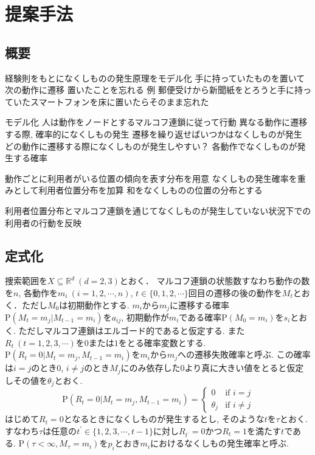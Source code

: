 \chapter{提案手法}\label{chap:method}

\section{概要}
経験則をもとになくしものの発生原理をモデル化
手に持っていたものを置いて次の動作に遷移
置いたことを忘れる
例
郵便受けから新聞紙をとろうと手に持っていたスマートフォンを床に置いたらそのまま忘れた

モデル化
人は動作をノードとするマルコフ連鎖に従って行動
異なる動作に遷移する際, 確率的になくしもの発生
遷移を繰り返せばいつかはなくしものが発生
どの動作に遷移する際になくしものが発生しやすい？
各動作でなくしものが発生する確率

動作ごとに利用者がいる位置の傾向を表す分布を用意
なくしもの発生確率を重みとして利用者位置分布を加算
和をなくしものの位置の分布とする

利用者位置分布とマルコフ連鎖を通じてなくしものが発生していない状況下での利用者の行動を反映

\section{定式化}
捜索範囲を$ X \subseteq \mathbb{R}^d \  (d=2,3)$とおく．
マルコフ連鎖の状態数すなわち動作の数を$ n $, 各動作を$ m_i\ (i=1,2,\cdots ,n)$, 
$ t \in \{0,1,2,\cdots\} $回目の遷移の後の動作を$ M_t $とおく．ただし$ M_0 $は初期動作とする. 
$ m_i $から$ m_j $に遷移する確率$ \mathrm{P}(M_t = m_j | M_{t-1} = m_i) $を$ a_{i j} $, 
初期動作が$ m_i $である確率$ \mathrm{P}(M_0 = m_i) $を$ s_i $とおく. 
ただしマルコフ連鎖はエルゴード的であると仮定する. \cite{funaki}
また$ R_t\ (t=1,2,3,\cdots) $を$ 0 $または$ 1 $をとる確率変数とする. 
$ \mathrm{P}(R_t = 0 | M_t = m_j , M_{t - 1} = m_i) $を$ m_i $から$ m_j $への遷移失敗確率と呼ぶ. 
この確率は$ i = j $のとき$ 0 $, $ i \ne j $のとき$ M_j $にのみ依存した$ 0 $より真に大きい値をとると仮定しその値を$ \theta_j $とおく. 
\begin{equation}
    \mathrm{P}(R_t = 0 | M_t = m_j , M_{t - 1} = m_i) =
    \begin{cases}
        0        & \text{if $i = j$}\\
        \theta_j & \text{if $i \ne j$}
    \end{cases}
\end{equation}
はじめて$ R_t = 0 $となるときになくしものが発生するとし, そのような$ t $を$ \tau $とおく. 
すなわち$ \tau $は任意の$ t^{\prime} \in \{1,2,3,\cdots,t-1\} $に対し$ R_{t^{\prime}} = 0 $かつ$ R_t = 1 $を満たす$ t $である. 
$ \mathrm{P}(\tau < \infty , M_{\tau} = m_i) $を$ p_i $とおき$ m_i $におけるなくしもの発生確率と呼ぶ. 


